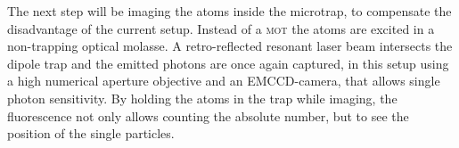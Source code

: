 The next step will be imaging the atoms inside the microtrap, to compensate the disadvantage of the current setup. Instead of a \textsc{mot} the atoms are excited in a non-trapping optical molasse. A retro-reflected resonant laser beam intersects the dipole trap and the emitted photons are once again captured, in this setup using a high numerical aperture objective and an EMCCD-camera, that allows single photon sensitivity. By holding the atoms in the trap while imaging, the fluorescence not only allows counting the absolute number, but to see the position of the single particles.



